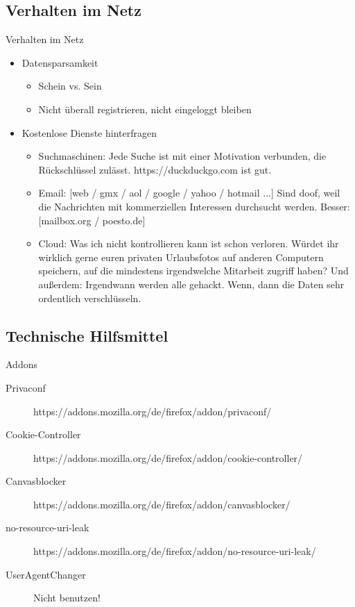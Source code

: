 \documentclass[utf8]{beamer}
\begin{document}
	\subsection{Verhalten im Netz}
	\begin{frame}{Verhalten im Netz}
		\begin{itemize}
			\item Datensparsamkeit
			\begin{itemize}
				\item Schein vs. Sein
				\item Nicht überall registrieren, nicht eingeloggt bleiben
			\end{itemize}
			\item Kostenlose Dienste hinterfragen
			\begin{itemize}
				\item Suchmaschinen:
				Jede Suche ist mit einer Motivation verbunden, die Rückschlüssel zulässt. https://duckduckgo.com ist gut.
				\item Email:
				[web / gmx / aol / google / yahoo / hotmail ...] Sind doof, weil die Nachrichten mit kommerziellen Interessen durchsucht werden. Besser: [mailbox.org / poesto.de]
				\item Cloud:
				Was ich nicht kontrollieren kann ist schon verloren. Würdet ihr wirklich gerne euren privaten Urlaubsfotos auf anderen Computern speichern, auf die mindestens irgendwelche Mitarbeit zugriff haben? Und außerdem: Irgendwann werden alle gehackt. Wenn, dann die Daten sehr ordentlich verschlüsseln.
			\end{itemize}
		\end{itemize}
	\end{frame}
	
	\subsection{Technische Hilfsmittel}
	\begin{frame}{Addons}
		\noindent
		\begin{description}
			\item[Privaconf]{https://addons.mozilla.org/de/firefox/addon/privaconf/}
			\item[Cookie-Controller]{https://addons.mozilla.org/de/firefox/addon/cookie-controller/}
			\item[Canvasblocker]{https://addons.mozilla.org/de/firefox/addon/canvasblocker/}
			\item[no-resource-uri-leak]{https://addons.mozilla.org/de/firefox/addon/no-resource-uri-leak/}
			\item[UserAgentChanger]{Nicht benutzen!}
		\end{description}
	\end{frame}
	
\end{document}
